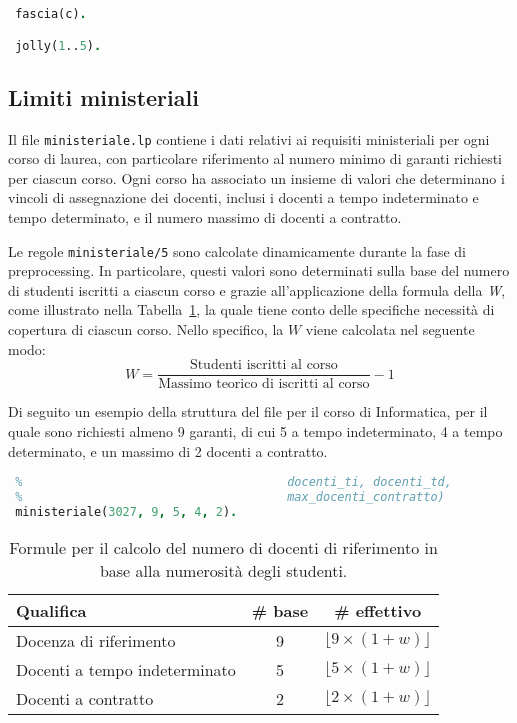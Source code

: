 \begin{lstlisting}[language=prolog, caption={Esempio struttura dati di \texttt{docenti\_a\_contratto.lp}.}]
 %  SEZIONE: FASCIE
 fascia(c).

 jolly(1..5).
\end{lstlisting}


\subsection{Limiti ministeriali}\label{sec:rules-ministeriale}

Il file \texttt{ministeriale.lp} contiene i dati relativi ai requisiti ministeriali per 
ogni corso di laurea, con particolare riferimento al numero minimo di garanti richiesti 
per ciascun corso. Ogni corso ha associato un insieme di valori che determinano i vincoli 
di assegnazione dei docenti, inclusi i docenti a tempo indeterminato e tempo determinato,
e il numero massimo di docenti a contratto.

Le regole \texttt{ministeriale/5} sono calcolate dinamicamente durante la fase di 
preprocessing. In particolare, questi valori sono determinati sulla base del numero di 
studenti iscritti a ciascun corso e grazie all'applicazione della formula della \textit{W}, 
come illustrato nella Tabella~\ref{tab:formula-w}, la quale tiene conto delle specifiche 
necessità di copertura di ciascun corso. Nello specifico, la $W$ viene calcolata nel 
seguente modo:
$$
W = \frac{
        \text{Studenti iscritti al corso}
    }
    {
        \text{Massimo teorico di iscritti al corso}
    }
    - 1
$$

Di seguito un esempio della struttura del file per il corso di Informatica, per 
il quale sono richiesti almeno 9 garanti, di cui 5 a tempo indeterminato, 4 a tempo 
determinato, e un massimo di 2 docenti a contratto. 

\begin{lstlisting}[language=prolog, caption={Esempio struttura dati di \texttt{ministeriale.lp}.}]    
 %  SEZIONE: Garanti minimi per corso (codice_corso, minimo_complessivo, 
 %                                     docenti_ti, docenti_td, 
 %                                     max_docenti_contratto)
 ministeriale(3027, 9, 5, 4, 2).
\end{lstlisting} 

\begin{table}[h]
    \centering
    \renewcommand{\arraystretch}{1.5}
    \begin{tabular}{|l|c|c|}
    \hline
    \textbf{Qualifica} & \textbf{\# base} & \textbf{\# effettivo} \\
    \hline
    Docenza di riferimento & 9 & $\lfloor 9 \times (1+w) \rfloor$ \\
    \hline
    Docenti a tempo indeterminato & 5 & $\lfloor 5 \times (1+w) \rfloor$ \\
    \hline
    Docenti a contratto & 2 & $\lfloor 2 \times (1+w) \rfloor$ \\
    \hline
    \end{tabular}
    \caption{Formule per il calcolo del numero di docenti di riferimento in base alla numerosità degli studenti.}
    \label{tab:formula-w}
\end{table}

